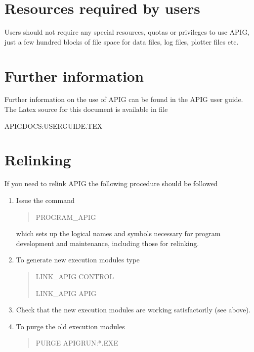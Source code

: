 \section{Resources required by users}

Users should not require any special resources, quotas or privileges
to use APIG, just a few hundred blocks of file space for data files,
log files, plotter files etc.

\section{Further information}

Further information on the use of APIG can be found in the APIG user
guide. The Latex source for this document is available in file

\begin{center}

APIGDOCS:USERGUIDE.TEX

\end{center}

\section{Relinking}

If you need to relink APIG the following procedure should be followed

\begin{enumerate}

  \item Issue the command

   \begin{verse}

PROGRAM\_APIG

   \end{verse}

   which sets up the logical names and symbols necessary for program
   development and maintenance, including those for relinking.

  \item To generate new execution modules type

   \begin{verse}

LINK\_APIG CONTROL

LINK\_APIG APIG

   \end{verse}

  \item Check that the new execution modules are working satisfactorily
   (see above).

  \item To purge the old execution modules

   \begin{verse}

PURGE APIGRUN:*.EXE

   \end{verse}

\end{enumerate}

